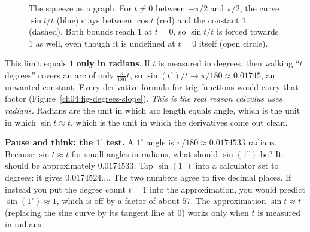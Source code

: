 \begin{figure}[htbp]
\centering
{}
\caption{The squeeze as a graph. For $t \ne 0$ between $-\pi/2$ and $\pi/2$, the curve $\sin t/t$ (blue) stays between $\cos t$ (red) and the constant $1$ (dashed). Both bounds reach $1$ at $t = 0$, so $\sin t/t$ is forced towards $1$ as well, even though it is undefined at $t = 0$ itself (open circle).}
\label{ch04:fig-squeeze-graph}
\end{figure}

\begin{trapbox}
This limit equals $1$ \textbf{only in radians}. If $t$ is measured in degrees, then walking ``$t$ degrees'' covers an arc of only $\tfrac{\pi}{180}t$, so $\sin(t^\circ)/t \to \pi/180 \approx 0.01745$, an unwanted constant. Every derivative formula for trig functions would carry that factor (Figure~\ref{ch04:fig-degrees-slope}). \emph{This is the real reason calculus uses radians.} Radians are the unit in which arc length equals angle, which is the unit in which $\sin t \approx t$, which is the unit in which the derivatives come out clean.
\end{trapbox}

\begin{recoverybox}
\textbf{Pause and think: the $1^\circ$ test.}
A $1^\circ$ angle is $\pi/180 \approx 0.0174533$ radians. Because $\sin t \approx t$ for small angles in radians, what should $\sin(1^\circ)$ be? It should be approximately $0.0174533$. Tap $\sin(1^\circ)$ into a calculator set to degrees: it gives $0.0174524\ldots$. The two numbers agree to five decimal places. If instead you put the degree count $t = 1$ into the approximation, you would predict $\sin(1^\circ) \approx 1$, which is off by a factor of about $57$. The approximation $\sin t \approx t$ (replacing the sine curve by its tangent line at $0$) works only when $t$ is measured in radians.
\end{recoverybox}

